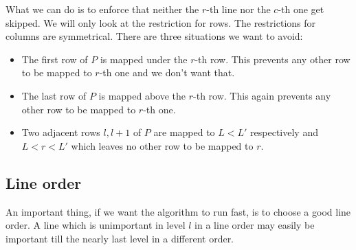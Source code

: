 What we can do is to enforce that neither the $r$-th line nor the $c$-th one get skipped. We will only look at the restriction for rows. The restrictions for columns are symmetrical. There are three situations we want to avoid:
\begin{itemize}
\item The first row of $P$ is mapped under the $r$-th row. This prevents any other row to be mapped to $r$-th one and we don't want that.
\item The last row of $P$ is mapped above the $r$-th row. This again prevents any other row to be mapped to $r$-th one.
\item Two adjacent rows $l,l+1$ of $P$ are mapped to $L<L'$ respectively and $L<r<L'$ which leaves no other row to be mapped to $r$.
\end{itemize}

\subsection{Line order}
\label{sect:order}
An important thing, if we want the algorithm to run fast, is to choose a good line order. A line which is unimportant in level $l$ in a line order may easily be important till the nearly last level in a different order.

